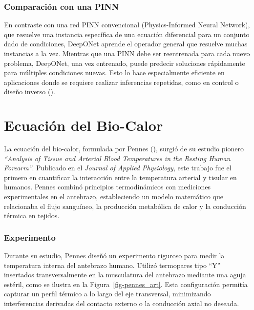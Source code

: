 \documentclass[
  spanish,
  us-letterpaper,
  DIV=11,
  numbers=noendperiod]{scrreprt}
\theoremstyle{definition}
\theoremstyle{plain}
\theoremstyle{remark}
\begin{document}
\section{Comparación con una PINN}\label{comparaciuxf3n-con-una-pinn}

En contraste con una red PINN convencional (Physics-Informed Neural
Network), que resuelve una instancia específica de una ecuación
diferencial para un conjunto dado de condiciones, DeepONet aprende el
operador general que resuelve muchas instancias a la vez. Mientras que
una PINN debe ser reentrenada para cada nuevo problema, DeepONet, una
vez entrenado, puede predecir soluciones rápidamente para múltiples
condiciones nuevas. Esto lo hace especialmente eficiente en aplicaciones
donde se requiere realizar inferencias repetidas, como en control o
diseño inverso ().

\part{Ecuación del Bio-Calor}

La ecuación del bio-calor, formulada por Pennes
(), surgió de su estudio pionero
\emph{``Analysis of Tissue and Arterial Blood Temperatures in the
Resting Human Forearm''}. Publicado en el \emph{Journal of Applied
Physiology}, este trabajo fue el primero en cuantificar la interacción
entre la temperatura arterial y tisular en humanos. Pennes combinó
principios termodinámicos con mediciones experimentales en el antebrazo,
estableciendo un modelo matemático que relacionaba el flujo sanguíneo,
la producción metabólica de calor y la conducción térmica en tejidos.

\section*{Experimento}\label{experimento}


Durante su estudio, Pennes diseñó un experimento riguroso para medir la
temperatura interna del antebrazo humano. Utilizó termopares tipo ``Y''
insertados transversalmente en la musculatura del antebrazo mediante una
aguja estéril, como se ilustra en la Figura~\ref{fig-pennes_art}. Esta
configuración permitía capturar un perfil térmico a lo largo del eje
transversal, minimizando interferencias derivadas del contacto externo o
la conducción axial no deseada.
\end{document}
